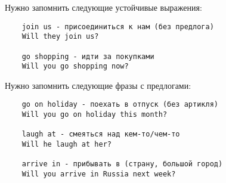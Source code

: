 Нужно запомнить следующие устойчивые выражения:
\begin{verbatim}
    join us - присоединиться к нам (без предлога)
    Will they join us?

    go shopping - идти за покупками
    Will you go shopping now?
\end{verbatim}

Нужно запомнить следующие фразы с предлогами:
\begin{verbatim}
    go on holiday - поехать в отпуск (без артикля)
    Will you go on holiday this month?

    laugh at - смеяться над кем-то/чем-то
    Will he laugh at her?

    arrive in - прибывать в (страну, большой город)
    Will you arrive in Russia next week?
\end{verbatim}